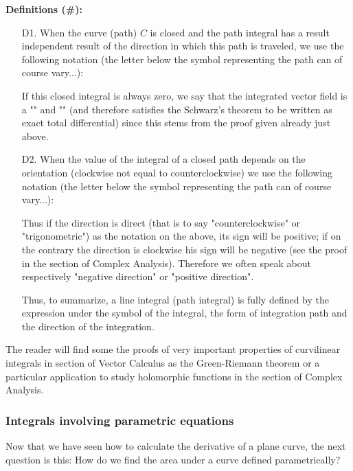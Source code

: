 	\textbf{Definitions (\#\mydef):}
	\begin{enumerate}
		\item[D1.] When the curve (path) $C$ is closed and the path integral has a result independent result of the direction in which this path is traveled, we use the following notation (the letter below the symbol representing the path can of course vary...):
		
		If this closed integral is always zero, we say that the integrated vector field is a "" and "" (and therefore satisfies the Schwarz's theorem to be written as exact total differential) since this stems from the proof given already just above.
		
		\item[D2.] \label{closed path orientation}When the value of the integral of a closed path depends on the orientation (clockwise not equal to counterclockwise) we use the following notation (the letter below the symbol representing the path can of course vary...):
		
		Thus if the direction is direct (that is to say "counterclockwise" or "trigonometric") as the notation on the above, its sign will be positive; if on the contrary the direction is clockwise his sign will be negative (see the proof in the section of Complex Analysis). Therefore we often speak about respectively "negative direction" or "positive direction".
		
		Thus, to summarize, a line integral (path integral) is fully defined by the expression under the symbol of the integral, the form of integration path and the direction of the integration.
	\end{enumerate}
	\begin{tcolorbox}[title=Remark,colframe=black,arc=10pt]
	The reader will find some the proofs of very important properties of curvilinear integrals  in section of Vector Calculus as the Green-Riemann theorem or a particular application to study holomorphic functions in the section of Complex Analysis.
	\end{tcolorbox}
	
	\subsubsection{Integrals involving parametric equations}
	Now that we have seen how to calculate the derivative of a plane curve, the next question is this: How do we find the area under a curve defined parametrically? 
	
